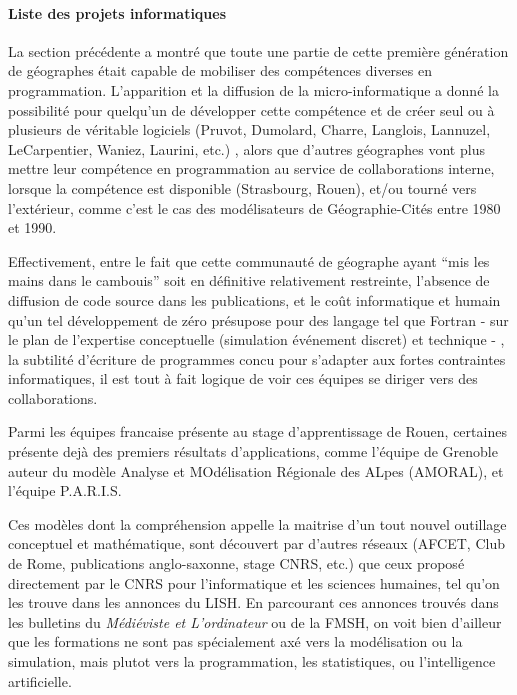 \paragraph{Liste des projets informatiques}

La section précédente a montré que toute une partie de cette première génération de géographes était capable de mobiliser des compétences diverses en programmation. L'apparition et la diffusion de la micro-informatique a donné la possibilité pour quelqu'un de développer cette compétence et de créer seul ou à plusieurs de véritable logiciels (Pruvot, Dumolard, Charre, Langlois, Lannuzel, LeCarpentier, Waniez, Laurini,  etc.) \autocites[191]{Mathieu2014}, alors que d'autres géographes vont plus mettre leur compétence en programmation au service de collaborations interne, lorsque la compétence est disponible (Strasbourg, Rouen), et/ou tourné vers l'extérieur, comme c'est le cas des modélisateurs de Géographie-Cités entre 1980 et 1990.

Effectivement, entre le fait que cette communauté de géographe ayant \enquote{mis les mains dans le cambouis} soit en définitive relativement restreinte, l'absence de diffusion de code source dans les publications, et le coût informatique et humain qu'un tel développement de zéro présupose pour des langage tel que Fortran - sur le plan de l'expertise conceptuelle (simulation événement discret) et technique - , la subtilité d'écriture de programmes concu pour s'adapter aux fortes contraintes informatiques, il est tout à fait logique de voir ces équipes se diriger vers des collaborations. %

Parmi les équipes francaise présente au stage d'apprentissage de Rouen, certaines présente dejà des premiers résultats d'applications, comme l’équipe de Grenoble auteur du modèle Analyse et MOdélisation Régionale des ALpes (AMORAL), et l’équipe P.A.R.I.S.  %

Ces modèles dont la compréhension appelle la maitrise d'un tout nouvel outillage conceptuel et mathématique, sont découvert par d'autres réseaux (AFCET, Club de Rome, publications anglo-saxonne, stage CNRS, etc.) que ceux proposé directement par le CNRS pour l'informatique et les sciences humaines, tel qu'on les trouve dans les annonces du LISH. En parcourant ces annonces trouvés dans les bulletins du \textit{Médiéviste et L'ordinateur} ou de la FMSH, on voit bien d'ailleur que les formations ne sont pas spécialement axé vers la modélisation ou la simulation, mais plutot vers la programmation, les statistiques, ou l'intelligence artificielle.

